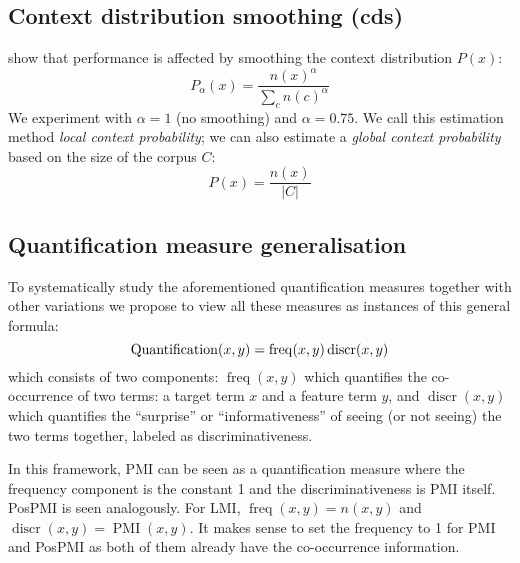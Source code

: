 \subsection{Context distribution smoothing (cds)}
\label{sec:cont-distr-smooth}

 show that performance is affected by smoothing the context distribution $P(x)$:
%
\begin{equation}
  \label{eq:cds}
  P_{\alpha}(x) = \frac{n(x)^{\alpha}}{\sum_{c}n(c)^{\alpha}}
\end{equation}
%
We experiment with $\alpha=1$ (no smoothing) and $\alpha = 0.75$. We call this estimation method \emph{local context probability}; we can also estimate a \emph{global context probability} based on the size of the corpus $C$:
%
\begin{equation}
  \label{eq:cds-nan}
  P(x) = \frac{n(x)}{|C|}
\end{equation}

\subsection{Quantification measure generalisation}
\label{sec:quantification-measures}

To systematically study the aforementioned quantification measures together with other variations we propose to view all these measures as instances of this general formula:
%
\begin{equation}
  \small
  \label{eq:association}
  \operatorname{Quantification}(x,y) = \operatorname{freq}(x, y)
                                       \operatorname{discr}(x, y)
\end{equation}
%
which consists of two components: $\operatorname{freq}(x, y)$ which quantifies the co-occurrence of two terms: a target term $x$ and a feature term $y$, and $\operatorname{discr}(x, y)$ which quantifies the ``surprise'' or ``informativeness'' of seeing (or not seeing) the two terms together,  labeled as discriminativeness.

In this framework, PMI can be seen as a quantification measure where the frequency component is the constant 1 and the discriminativeness is PMI itself. PosPMI is seen analogously. For LMI, $\operatorname{freq}(x, y) = n(x, y)$ and $\operatorname{discr}(x, y) = \operatorname{PMI}(x, y)$. It makes sense to set the frequency to 1 for PMI and PosPMI as both of them already have the co-occurrence information.


